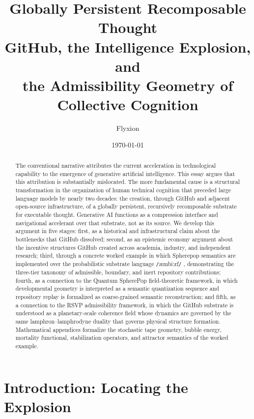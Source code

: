 \documentclass[11pt]{article}
\title{{\large\bfseries Globally Persistent Recomposable Thought}\\[4pt]
{\normalsize GitHub, the Intelligence Explosion, and\\
the Admissibility Geometry of Collective Cognition}}
\author{Flyxion}
\date{\today}
\newcommand{\ambibf}{%
  \texttt{/}\textnormal{æmbiːɛf}\texttt{/}%
}
\begin{document}
\maketitle

\begin{abstract}
The conventional narrative attributes the current acceleration in technological
capability to the emergence of generative artificial intelligence. This essay
argues that this attribution is substantially mislocated. The more fundamental
cause is a structural transformation in the organization of human technical
cognition that preceded large language models by nearly two decades: the
creation, through GitHub and adjacent open-source infrastructure, of a globally
persistent, recursively recomposable substrate for executable thought. Generative
AI functions as a compression interface and navigational accelerant over that
substrate, not as its source. We develop this argument in five stages: first, as
a historical and infrastructural claim about the bottlenecks that GitHub
dissolved; second, as an epistemic economy argument about the incentive
structures GitHub created across academia, industry, and independent research;
third, through a concrete worked example in which Spherepop semantics are
implemented over the probabilistic substrate language \ambibf{},
demonstrating the three-tier taxonomy of admissible, boundary, and inert
repository contributions; fourth, as a connection to the Quantum SpherePop
field-theoretic framework, in which developmental geometry is interpreted as
a semantic quantization sequence and repository replay is formalized as
coarse-grained semantic reconstruction; and fifth, as a connection to the RSVP
admissibility framework, in which the GitHub substrate is understood as a
planetary-scale coherence field whose dynamics are governed by the same
lamphron--lamphrodyne duality that governs physical structure formation.
Mathematical appendices formalize the stochastic tape geometry, bubble energy,
mortality functional, stabilization operators, and attractor semantics of the
worked example.
\end{abstract}

\newpage
\tableofcontents
\newpage

\section{Introduction: Locating the Explosion}
\end{document}
